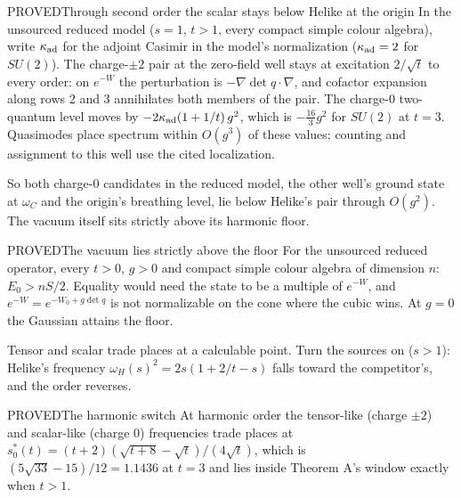 \begin{claim}{PROVED}{Through second order the scalar stays below Helike at the origin}\label{b:origin}
In the unsourced reduced model ($s=1$, $t>1$, every compact simple colour algebra), write $\kappa_{\rm ad}$ for the
adjoint Casimir in the model's normalization ($\kappa_{\rm ad}=2$ for $SU(2)$). The charge-$\pm2$ pair at the
zero-field well stays at excitation $2/\sqrt t$ to every order: on $e^{-W}$ the perturbation is
$-\nabla\det q\cdot\nabla$, and cofactor expansion along rows 2 and 3 annihilates both members of the pair. The
charge-0 two-quantum level moves by $-2\kappa_{\rm ad}(1+1/t)\,g^2$, which is $-\tfrac{16}{3}g^2$ for $SU(2)$ at $t=3$.
Quasimodes place spectrum within $O(g^3)$ of these values; counting and assignment to this well use the cited
localization.
\end{claim}

So both charge-0 candidates in the reduced model, the other well's ground state at $\omega_C$ and the origin's
breathing level, lie below Helike's pair through $O(g^2)$. The vacuum itself sits strictly above its harmonic floor.

\begin{claim}{PROVED}{The vacuum lies strictly above the floor}\label{b:vacfloor}
For the unsourced reduced operator, every $t>0$, $g>0$ and compact simple colour algebra of dimension $n$:
$E_0>nS/2$. Equality would need the state to be a multiple of $e^{-W}$, and $e^{-W}=e^{-W_0+g\det q}$ is not
normalizable on the cone where the cubic wins. At $g=0$ the Gaussian attains the floor.
\end{claim}

 Tensor and scalar trade places at a calculable point. Turn the sources on ($s>1$): Helike's frequency
$\omega_H(s)^2=2s(1+2/t-s)$ falls toward the competitor's, and the order reverses.

\begin{claim}{PROVED}{The harmonic switch}\label{b:switch0}
At harmonic order the tensor-like (charge $\pm2$) and scalar-like (charge 0) frequencies trade places at
$s_0^*(t)=(t+2)(\sqrt{t+8}-\sqrt t)/(4\sqrt t)$, which is $(5\sqrt{33}-15)/12=1.1436$ at $t=3$ and lies inside Theorem
A's window exactly when $t>1$.
\end{claim}

